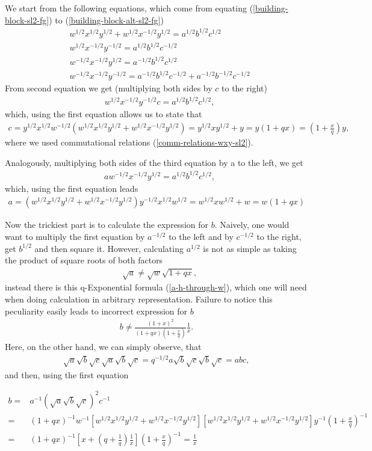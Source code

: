 \documentclass{article}
\newcommand{\lb}{\left (}
\newcommand{\rb}{\right )}
\newcommand{\lsb}{\left [}
\newcommand{\rsb}{\right ]}
\newcommand{\be}{\begin{eqnarray}}
\newcommand{\ee}{\end{eqnarray}}
\newcommand {\?}{\textit{???}}
\newcommand{\delabel}[1]{(\ref{#1})}
\begin{document}
We start from the following equations, which come from equating \delabel{building-block-sl2-fg} to \delabel{building-block-alt-sl2-fg}
\be
& w^{1/2}x^{1/2} y^{1/2} + w^{1/2}x^{-1/2}y^{1/2} = a^{1/2}b^{1/2}c^{1/2} \\
& w^{1/2}x^{-1/2}y^{-1/2} = a^{1/2}b^{1/2}c^{-1/2} \\
& w^{-1/2}x^{-1/2}y^{1/2} = a^{-1/2}b^{1/2}c^{1/2} \\
& w^{-1/2}x^{-1/2}y^{-1/2} = a^{-1/2}b^{1/2}c^{-1/2} + a^{-1/2}b^{-1/2}c^{-1/2}
\ee
From second equation we get (multiplying both sides by $c$ to the right)
\be
& w^{1/2}x^{-1/2}y^{-1/2} c = a^{1/2}b^{1/2}c^{1/2},
\ee
which, using the first equation allows us to state that
\be
c = y^{1/2}x^{1/2}w^{-1/2}\lb w^{1/2}x^{1/2}y^{1/2} + w^{1/2}x^{-1/2}y^{1/2} \rb
= y^{1/2} x y^{1/2} + y = y\lb 1 + qx\rb = \lb 1 + \frac{x}{q} \rb y,
\ee
where we used commutational relations \delabel{comm-relations-wxy-sl2}.

Analogously, multiplying both sides of the third equation by a to the left, we get
\be
& a w^{-1/2} x^{-1/2} y^{1/2} = a^{1/2}b^{1/2}c^{1/2},
\ee
which, using the first equation leads
\be
a = \lb w^{1/2}x^{1/2}y^{1/2} + w^{1/2}x^{-1/2}y^{1/2} \rb y^{-1/2}x^{1/2}w^{1/2}
= w^{1/2}x w^{1/2} + w = w \lb 1 + q x \rb
\ee

Now the trickiest part is to calculate the expression for $b$. Naively, one  would want
to multiply the first equation by $a^{-1/2}$ to the left and by $c^{-1/2}$ to the right,
get $b^{1/2}$ and then square it.
However, calculating $a^{1/2}$ is not as simple as taking the product of square roots of both factors
\be
&\sqrt{a} \neq \sqrt{w} \sqrt{1 + q x},
\ee
instead there is this q-Exponential formula \delabel{a-h-through-w}, which one will need when
doing calculation in arbitrary representation.
Failure to notice this peculiarity easily leads to incorrect expression for $b$
\be
b \neq \frac{\lb 1 + x\rb^2}{\lb 1 + q x\rb\lb 1 + \frac{x}{q}\rb} \frac{1}{x}.
\ee
Here, on the other hand, we can simply observe, that
\be
\sqrt{a} \sqrt{b} \sqrt{c} \sqrt{a} \sqrt{b} \sqrt{c} = q^{-1/2} a \sqrt{b} \sqrt{c} \sqrt{b} \sqrt{c} = abc,
\ee
and then, using the first equation

\be
b = & a^{-1} \lb \sqrt{a}\sqrt{b}\sqrt{c} \rb^2 c^{-1} & \nonumber \\
= & \lb 1 + qx\rb^{-1}w^{-1}\lsb w^{1/2}x^{1/2}y^{1/2} + w^{1/2}x^{-1/2}y^{1/2} \rsb
\lsb w^{1/2}x^{1/2}y^{1/2} + w^{1/2}x^{-1/2}y^{1/2} \rsb y^{-1}\lb 1 + \frac{x}{q}\rb^{-1}
\\ = & \lb 1 + qx\rb^{-1} \lsb x + \lb q + \frac{1}{q} \rb \frac{1}{x} \rsb \lb 1 + \frac{x}{q}\rb^{-1} = \frac{1}{x}
\nonumber 
\ee
\end{document}
